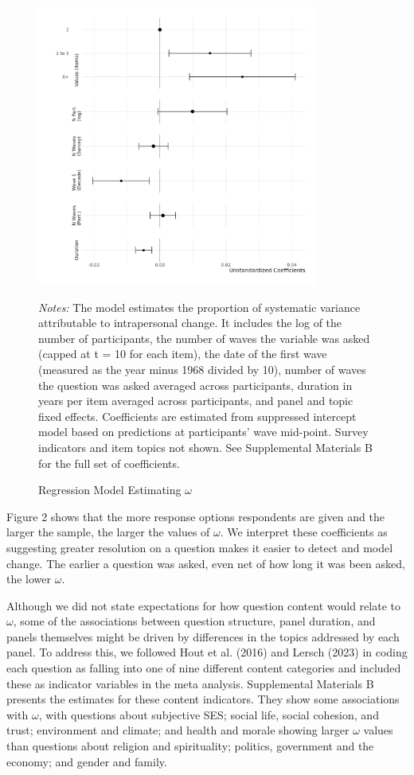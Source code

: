 \documentclass[
  12pt,
]{article}
\begin{document}
\begin{figure}[htp]
\begin{center}
\caption{Regression Model Estimating $\omega$}

\includegraphics[width=350px]{../figures/figure_2}

\end{center}
\footnotesize{\textit{Notes:} The model estimates the proportion of systematic variance attributable to intrapersonal change. It includes the log of the number of participants, the number of waves the variable was asked (capped at t = 10 for each item), the date of the first wave (measured as the year minus 1968 divided by 10), number of waves the question was asked averaged across participants, duration in years per item averaged across participants, and panel and topic fixed effects. Coefficients are estimated from suppressed intercept model based on predictions at participants' wave mid-point. Survey indicators and item topics not shown. See Supplemental Materials B for the full set of coefficients.}
\end{figure}

Figure 2 shows that the more response options respondents are given and
the larger the sample, the larger the values of \(\omega\). We interpret
these coefficients as suggesting greater resolution on a question makes
it easier to detect and model change. The earlier a question was asked,
even net of how long it was been asked, the lower \(\omega\).

Although we did not state expectations for how question content would
relate to \(\omega\), some of the associations between question
structure, panel duration, and panels themselves might be driven by
differences in the topics addressed by each panel. To address this, we
followed Hout et al. (2016) and Lersch (2023) in coding each question as
falling into one of nine different content categories and included these
as indicator variables in the meta analysis. Supplemental Materials B
presents the estimates for these content indicators. They show some
associations with \(\omega\), with questions about subjective SES;
social life, social cohesion, and trust; environment and climate; and
health and morale showing larger \(\omega\) values than questions about
religion and spirituality; politics, government and the economy; and
gender and family.
\end{document}
